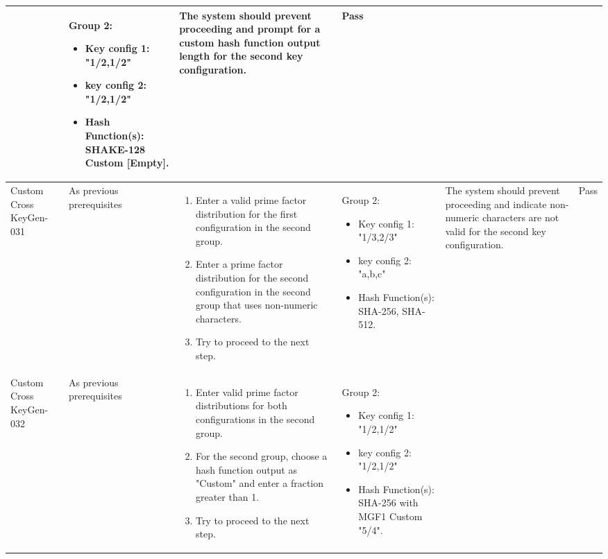 \documentclass[]{final_report}
\theoremstyle{definition}
\begin{document}
\begin{longtable}{|p{1.5cm}|p{2.5cm}|p{3.5cm}|p{2.5cm}|p{3cm}|p{2cm}|}
\begin{enumerate}
  \end{enumerate} & 
    Group 2: 
    \begin{itemize}
 \item Key config 1: "1/2,1/2"
 \item key config 2:  "1/2,1/2"
 \item Hash Function(s): SHAKE-128 Custom [Empty].
    \end{itemize}
   & The system should prevent proceeding and prompt for a custom hash function output length for the second key configuration. & Pass \\
  \hline
 Custom
 Cross
 KeyGen-031 & As previous prerequisites &
  \begin{enumerate}
    \item Enter a valid prime factor distribution for the first configuration in the second group.
    \item Enter a prime factor distribution for the second configuration in the second group that uses non-numeric characters.
    \item Try to proceed to the next step.
  \end{enumerate} & 
     Group 2: 
    \begin{itemize}
 \item Key config 1: "1/3,2/3"
 \item key config 2:  "a,b,c"
 \item Hash Function(s): SHA-256, SHA-512.
    \end{itemize}
 & The system should prevent proceeding and indicate non-numeric characters are not valid for the second key configuration. & Pass \\
  \hline
  Custom
  Cross
  KeyGen-032 & As previous prerequisites &
  \begin{enumerate}
    \item Enter valid prime factor distributions for both configurations in the second group.
    \item For the second group, choose a hash function output as "Custom" and enter a fraction greater than 1.
    \item Try to proceed to the next step.
  \end{enumerate} & 
   Group 2: 
    \begin{itemize}
 \item Key config 1: "1/2,1/2"
 \item key config 2:  "1/2,1/2"
 \item Hash Function(s): SHA-256 with MGF1 Custom "5/4".
    \end{itemize}

\end{longtable}
\end{document}
